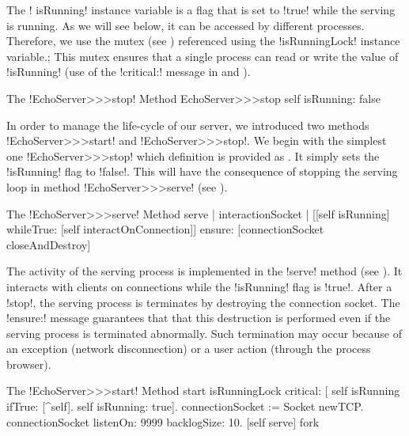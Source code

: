 \documentclass[a4paper,10pt,twoside]{book}
\begin{document}
The \ct! isRunning! instance variable is a flag that is set to \ct!true! while the serving is running.
As we will see below, it can be accessed by different processes.
Therefore, we use the mutex (see ) referenced using the \ct!isRunningLock! instance variable.; 
This mutex ensures that a single process can read or write the value of \ct!isRunning! (use of the \ct!critical:! message in  and ).

\begin{method}{The \ct!EchoServer>>>stop! Method}
EchoServer>>>stop
	self isRunning: false
\end{method}

In order to manage the life-cycle of our server, we introduced two methods \ct!EchoServer>>>start! and \ct!EchoServer>>>stop!.
We begin with the simplest one \ct!EchoServer>>>stop! which definition is provided as .
It simply sets the \ct!isRunning! flag to \ct!false!.
This will have the consequence of stopping the serving loop in method \ct!EchoServer>>>serve! (see ). 

\begin{method}{The \ct!EchoServer>>>serve! Method}
serve
| interactionSocket |
[[self isRunning]
	whileTrue: [self interactOnConnection]]
	ensure: [connectionSocket closeAndDestroy]
\end{method}

The activity of the serving process is implemented in the \ct!serve! method (see ).
It interacts with clients on connections while the \ct!isRunning! flag is \ct!true!.
After a \ct!stop!, the serving process is terminates by destroying the connection socket.
The \ct!ensure:! message guarantees that that this destruction is performed even if the serving process is terminated abnormally. 
Such termination may occur because of an exception (\eg network disconnection) or a user action (\eg through the process browser).   

\begin{method}{The \ct!EchoServer>>>start! Method}
start
	isRunningLock critical: [
		self isRunning ifTrue: [^self].
		self isRunning: true].
	connectionSocket := Socket newTCP.
	connectionSocket listenOn: 9999 backlogSize: 10.
	[self serve] fork
\end{method}
\end{document}
